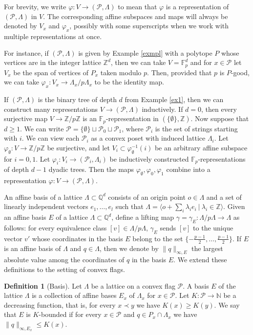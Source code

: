 \documentclass{daj}
\renewcommand{\le}{\leqslant}
\renewcommand{\ge}{\geqslant}
\newcommand{\Q}{\mathbb Q}
\newcommand{\Z}{\mathbb Z}
\newcommand{\N}{\mathbb N}
\newcommand{\FF}{\mathbb F}
\renewcommand{\P}{\mathcal P}
\theoremstyle{definition}
\newtheorem{defi}[theorem]{Definition}
\theoremstyle{remark}
\theoremstyle{definition}
\theoremstyle{definition}
\begin{document}
For brevity, we write $\varphi: V \rightarrow (\P, \Lambda)$ to mean that $\varphi$ is a representation of $(\P, \Lambda)$ in $V$. The corresponding affine subspaces and maps will always be denoted by $V_x$ and $\varphi_x$, possibly with some superscripts when we work with multiple representations at once.

For instance, if $(\P,\Lambda)$ is given by Example \ref{exmpl} with a polytope $P$ whose vertices are in the integer lattice $\Z^d$, then we can take $V = \FF_p^d$ and for $x\in \P$ let $V_x$ be the span of vertices of $P_x$ taken modulo $p$. Then, provided that $p$ is $P$-good, we can take $\varphi_x: V_x \to \Lambda_x/p\Lambda_x$ to be the identity map. 

If $(\P,\Lambda)$ is the binary tree of depth $d$ from Example \ref{ex1}, then we can construct many representations $V\to (\P,\Lambda)$ inductively. If $d=0$, then every surjective map $V\to \Z/p\Z$ is an $\FF_p$-representation in $(\{\emptyset\}, \Z)$. Now suppose that $d\ge 1$. We can write $\P = \{\emptyset\} \sqcup \P_0\sqcup \P_1$, where $\P_i$ is the set of strings starting with $i$.
We can view each $\P_i$ as a convex poset with induced lattice $\Lambda_i$. Let $\varphi_\emptyset: V \to \Z/p\Z$ be surjective, and let $V_i \subset \varphi_\emptyset^{-1}(i)$ be an arbitrary affine subspace for $i=0,1$. Let $\varphi_i:V_i \to (\P_i, \Lambda_i)$ be inductively constructed $\FF_p$-representations of depth $d-1$ dyadic trees. Then the maps $\varphi_\emptyset,\varphi_0,\varphi_1$ combine into a representation $\varphi:V\to (\P,\Lambda)$. 




An affine basis of a lattice $\Lambda \subset \Q^d$ consists of an origin point $o \in \Lambda$ and a set of linearly independent vectors $e_1, \ldots, e_l$ such that $\Lambda = \langle o + \sum_i \lambda_i e_i~|~ \lambda_i \in \Z \rangle$.
Given an affine basis $E$ of a lattice $\Lambda \subset \Q^d$, define a lifting map $\gamma = \gamma_E: \Lambda / p\Lambda \rightarrow \Lambda$ as follows: for every equivalence class $[v] \in \Lambda/p\Lambda$, $\gamma_E$ sends $[v]$ to the unique vector $v'$ whose coordinates in the basis $E$ belong to the set $\{-\frac{p-1}{2}, \ldots, \frac{p-1}{2}\}$. If $E$ is an affine basis of $\Lambda$ and $q \in \Lambda$, then we denote by $\|q\|_{\infty, E}$ the largest absolute value among the coordinates of $q$ in the basis $E$. We extend these definitions to the setting of convex flags.

\begin{defi}[Basis]\label{Kb}
Let $\Lambda$ be a lattice on a convex flag $\P$. A basis $E$ of the lattice $\Lambda$ is a collection of affine bases $E_x$ of $\Lambda_x$ for $x \in \P$. Let $K: \P \rightarrow \N$ be a decreasing function, that is, for every $x \prec y$ we have $K(x) \ge K(y)$. We say that $E$ is $K$-bounded if for every $x \in \P$ and $q \in P_x \cap \Lambda_x$ we have $\|q\|_{\infty, E_x} \le K(x)$.
\end{defi}
\end{document}
